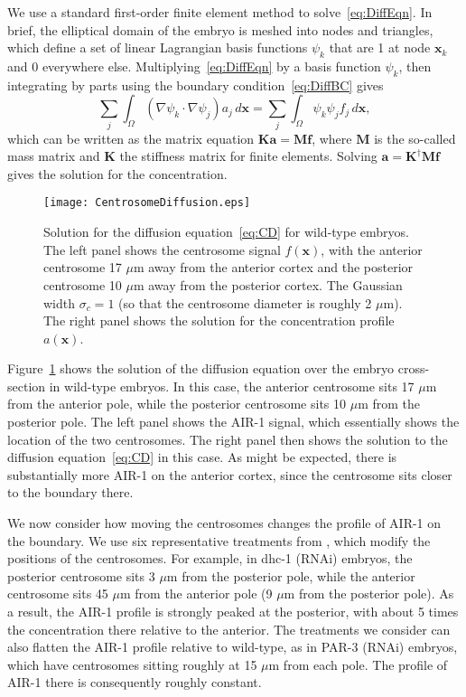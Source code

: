 \documentclass[11pt]{article}
\newcommand{\V}[1]{\boldsymbol{#1}}                 %
\newcommand{\M}[1]{\boldsymbol{#1}}
\begin{document}
We use a standard first-order finite element method to solve\ \eqref{eq:DiffEqn}. In brief, the elliptical domain of the embryo is meshed into nodes and triangles, which define a set of linear Lagrangian basis functions $\psi_k$ that are 1 at node $\V{x}_k$ and 0 everywhere else. Multiplying\ \eqref{eq:DiffEqn} by a basis function $\psi_k$, then integrating by parts using the boundary condition\ \eqref{eq:DiffBC} gives 
\begin{equation}
\sum_j \int_{\Omega} \left(\nabla \psi_k \cdot \nabla \psi_j\right) a_j \, d\V{x}= \sum_j \int_{\Omega} \psi_k \psi_j f_j \, d\V{x},
\end{equation}
which can be written as the matrix equation $\M{K}\V{a}=\M{M}\V{f}$, where $\M{M}$ is the so-called mass matrix and $\M{K}$ the stiffness matrix for finite elements. Solving $\V{a}=\M{K}^\dagger \M{M}\V{f}$ gives the solution for the concentration.

\begin{figure}
\centering
\texttt{[image: CentrosomeDiffusion.eps]}
\caption{\label{fig:CentDiff} Solution for the diffusion equation\ \eqref{eq:CD} for wild-type embryos. The left panel shows the centrosome signal $f(\V x)$, with the anterior centrosome 17 $\mu$m away from the anterior cortex and the posterior centrosome 10 $\mu$m away from the posterior cortex. The Gaussian width $\sigma_c=1$ (so that the centrosome diameter is roughly 2 $\mu$m). The right panel shows the solution for the concentration profile $a(\V x)$. }
\end{figure}

Figure\ \ref{fig:CentDiff} shows the solution of the diffusion equation over the embryo cross-section in wild-type embryos. In this case, the anterior centrosome sits 17 $\mu$m from the anterior pole, while the posterior centrosome sits 10 $\mu$m from the posterior pole. The left panel shows the AIR-1 signal, which essentially shows the location of the two centrosomes. The right panel then shows the solution to the diffusion equation\ \eqref{eq:CD} in this case. As might be expected, there is substantially more AIR-1 on the anterior cortex, since the centrosome sits closer to the boundary there.

We now consider how moving the centrosomes changes the profile of AIR-1 on the boundary. We use six representative treatments from \cite{longhini2022aurora}, which modify the positions of the centrosomes. For example, in dhc-1 (RNAi) embryos, the posterior centrosome sits 3 $\mu$m from the posterior pole, while the anterior centrosome sits 45 $\mu$m from the anterior pole (9 $\mu$m from the posterior pole). As a result, the AIR-1 profile is strongly peaked at the posterior, with about 5 times the concentration there relative to the anterior. The treatments we consider can also flatten the AIR-1 profile relative to wild-type, as in PAR-3 (RNAi) embryos, which have centrosomes sitting roughly at 15 $\mu$m from each pole. The profile of AIR-1 there is consequently roughly constant.
\end{document}
